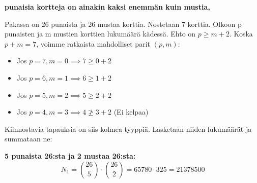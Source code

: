 \documentclass[12pt,a4paper]{article}
\begin{document}
\begin{kohta}
\begin{comment}
\end{comment}




\pagebreak
  \item \textbf{punaisia kortteja on ainakin kaksi enemmän kuin mustia,}
\begin{comment}
  
  \textbf{Ratkaisu:}

  Punaisia kortteja on 26 (hertta + ruutu), mustia 26 (risti + pata).  
  Nostetaan 7 korttia, ja halutaan:

  \[
  \text{Punaiset} - \text{Mustat} \ge 2
  \quad \Leftrightarrow \quad
  \text{Punaiset} \ge \left\lceil \frac{7 + 2}{2} \right\rceil = 5
  \]

  Eli punaisia kortteja oltava vähintään 5. Käydään läpi kaikki tapaukset:
  \begin{alakohta}
    \item 5 punaista, 2 mustaa
    \item 6 punaista, 1 musta
    \item 7 punaista, 0 mustaa
  \end{alakohta}

  Jokaisessa tapauksessa valitaan ensin punaiset ja sitten mustat:
  \[
  \sum_{r=5}^{7} \binom{26}{r} \cdot \binom{26}{7 - r}
  \]

  Kokonaismäärä on $\binom{52}{7}$, joten todennäköisyys:
  \[
  P = \frac{1}{\binom{52}{7}} \sum_{r=5}^{7} \binom{26}{r} \cdot \binom{26}{7 - r}
  \]

  \textbf{Vastaus:} \(\dfrac{\sum_{r=5}^{7} \binom{26}{r} \cdot \binom{26}{7 - r}}{\binom{52}{7}}\)
\end{comment}

Pakassa on 26 punaista ja 26 mustaa korttia. Nostetaan 7 korttia. Olkoon p punaisten ja m mustien korttien lukumäärä kädessä.
Ehto on $p \ge m + 2$. Koska $p+m=7$, voimme ratkaista mahdolliset parit $(p, m)$:
\begin{itemize}
    \item Jos $p=7, m=0 \implies 7 \ge 0+2$
    \item Jos $p=6, m=1 \implies 6 \ge 1+2$
    \item Jos $p=5, m=2 \implies 5 \ge 2+2$
    \item Jos $p=4, m=3 \implies 4 \not\ge 3+2$ (Ei kelpaa)
  \end{itemize}
Kiinnostavia tapauksia on siis kolmea tyyppiä. Lasketaan niiden lukumäärät ja summataan ne:

\begin{alakohta}
    \item \textbf{5 punaista 26:sta ja 2 mustaa 26:sta:} \\
    \[ N_1 = \binom{26}{5} \cdot \binom{26}{2} = 65780 \cdot 325 = 21378500 \]


\end{alakohta}
\end{kohta}
\end{document}
